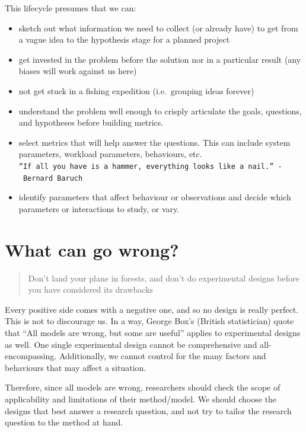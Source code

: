 \documentclass[]{book}
\providecommand{\tightlist}{%
  \setlength{\itemsep}{0pt}\setlength{\parskip}{0pt}}
\begin{document}
This lifecycle presumes that we can:

\begin{itemize}
\tightlist
\item
  sketch out what information we need to collect (or already have) to get from a vague idea to the hypothesis stage for a planned project
\item
  get invested in the problem before the solution nor in a particular result (any biases will work against us here)
\item
  not get stuck in a fishing expedition (i.e.~grouping ideas forever)
\item
  understand the problem well enough to crisply articulate the goals, questions, and hypotheses before building metrics.
\item
  select metrics that will help answer the questions. This can include system parameters, workload parameters, behaviours, etc. \texttt{“If\ all\ you\ have\ is\ a\ hammer,\ everything\ looks\ like\ a\ nail.”\ -\ Bernard\ Baruch}
\item
  identify parameters that affect behaviour or observations and decide which parameters or interactions to study, or vary.
\end{itemize}

\hypertarget{what-can-go-wrong}{%
\section{What can go wrong?}\label{what-can-go-wrong}}

\begin{quote}
Don't land your plane in forests, and don't do experimental designs before you have considered its drawbacks
\end{quote}

Every positive side comes with a negative one, and so no design is really perfect. This is not to discourage us. In a way, George Box's (British statistician) quote that ``All models are wrong, but some are useful'' applies to experimental designs as well. One single experimental design cannot be comprehensive and all-encompassing. Additionally, we cannot control for the many factors and behaviours that may affect a situation.

Therefore, since all models are wrong, researchers should check the scope of applicability and limitations of their method/model. We should choose the designs that best answer a research question, and not try to tailor the research question to the method at hand.
\end{document}
